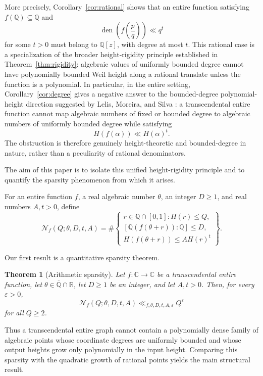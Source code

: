 \documentclass[11pt]{amsart}
\newtheorem{theorem}{Theorem}[section]
\theoremstyle{remark}
\newcommand{\Q}{\mathbb{Q}}
\newcommand{\R}{\mathbb{R}}
\newcommand{\C}{\mathbb{C}}
\newcommand{\Qbar}{\overline{\mathbb{Q}}}
\DeclareMathOperator{\den}{den}
\begin{document}
More precisely, Corollary~\ref{cor:rational} shows that an entire function satisfying $f(\Q)\subseteq\Q$ and
\[
\den\!\left(f\!\left(\frac pq\right)\right)\ll q^t
\]
for some $t>0$ must belong to $\Q[z]$, with degree at most $t$. This rational case is a specialization of the broader height-rigidity principle established in Theorem~\ref{thm:rigidity}: algebraic values of uniformly bounded degree cannot have polynomially bounded Weil height along a rational translate unless the function is a polynomial. In particular, in the entire setting, Corollary~\ref{cor:degree} gives a negative answer to the bounded-degree polynomial-height direction suggested by Lelis, Moreira, and Silva \cite{LelisMoreiraSilva2026}: a transcendental entire function cannot map algebraic numbers of fixed or bounded degree to algebraic numbers of uniformly bounded degree while satisfying
\[
H(f(\alpha))\ll H(\alpha)^t.
\]
The obstruction is therefore genuinely height-theoretic and bounded-degree in nature, rather than a peculiarity of rational denominators.

The aim of this paper is to isolate this unified height-rigidity principle and to quantify the sparsity phenomenon from which it arises.

For an entire function $f$, a real algebraic number $\theta$, an integer $D\geq1$, and real numbers $A,t>0$, define
\[
\mathcal N_f(Q;\theta,D,t,A)
=
\#\left\{
\begin{array}{c}
r\in\Q\cap[0,1]: H(r)\leq Q,\\[2mm]
[\Q(f(\theta+r)):\Q]\leq D,\\[1mm]
H(f(\theta+r))\leq A H(r)^t
\end{array}
\right\}.
\]

Our first result is a quantitative sparsity theorem.

\begin{theorem}[Arithmetic sparsity]\label{thm:sparsity}
Let $f:\C\to\C$ be a transcendental entire function, let $\theta\in\Qbar\cap\R$, let $D\geq1$ be an integer, and let $A,t>0$. Then, for every $\varepsilon>0$,
\[
\mathcal N_f(Q;\theta,D,t,A)
\ll_{f,\theta,D,t,A,\varepsilon} Q^{\varepsilon}
\]
for all $Q\geq2$.
\end{theorem}

Thus a transcendental entire graph cannot contain a polynomially dense family of algebraic points whose coordinate degrees are uniformly bounded and whose output heights grow only polynomially in the input height. Comparing this sparsity with the quadratic growth of rational points yields the main structural result.
\end{document}
